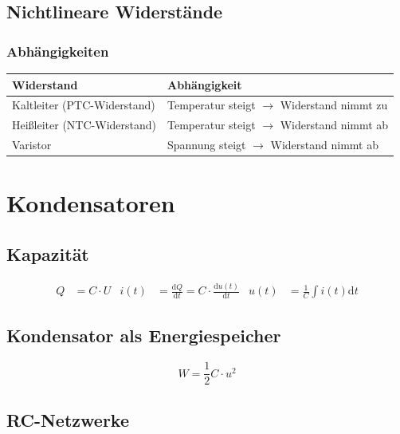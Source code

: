 	\subsection{Nichtlineare Widerstände}
		\subsubsection{Abhängigkeiten}
			\begin{table}[here]
			\begin{tabular}{ll}
			Widerstand & Abhängigkeit\\
			\toprule
			Kaltleiter (PTC-Widerstand) & Temperatur steigt $\rightarrow$ Widerstand nimmt zu\\
			\midrule
			Heißleiter (NTC-Widerstand) & Temperatur steigt $\rightarrow$ Widerstand nimmt ab\\
			\midrule
			Varistor & Spannung steigt $\rightarrow$ Widerstand nimmt ab\\
			\end{tabular}
			\end{table}
\section{Kondensatoren}
	\subsection{Kapazität}
		\begin{align*}
			Q&=C\cdot U & i(t)&=\frac{\mathrm{d}Q}{\mathrm{d}t}=C\cdot\frac{\mathrm{d}u(t)}{\mathrm{d}t} & u(t)&=\frac{1}{C}\int i(t)\mathrm{d}t
		\end{align*}
	\subsection{Kondensator als Energiespeicher}
		\[
			W=\frac{1}{2}C\cdot u^2
		\]
	
	\subsection{RC-Netzwerke}


